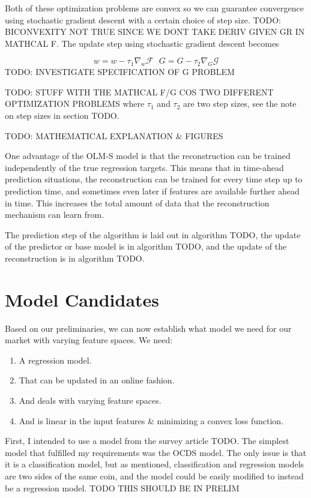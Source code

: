 Both of these optimization problems are convex so we can guarantee convergence
using stochastic gradient descent with a certain choice of step size. TODO:
BICONVEXITY NOT TRUE SINCE WE DONT TAKE DERIV GIVEN GR IN MATHCAL F. The update
step using stochastic gradient descent becomes

\begin{equation}
  w = w - \tau_1 \nabla_w \mathcal F \,\,\,\, G = G - \tau_2 \nabla_G \mathcal G
\end{equation}
TODO: INVESTIGATE SPECIFICATION OF G PROBLEM

TODO: STUFF WITH THE MATHCAL F/G COS TWO DIFFERENT OPTIMIZATION PROBLEMS
where $\tau_1$ and $\tau_2$ are two step sizes, see the note on step sizes in
section TODO.

TODO: MATHEMATICAL EXPLANATION \& FIGURES

One advantage of the OLM-S model is that the reconstruction can be trained
independently of the true regression targets. This means that in time-ahead
prediction situations, the reconstruction can be trained for every time step up
to prediction time, and sometimes even later if features are available further
ahead in time. This increases the total amount of data that the reconstruction
mechanism can learn from.

The prediction step of the algorithm is laid out in algorithm TODO, the update
of the predictor or base model is in algorithm TODO, and the update of the
reconstruction is in algorithm TODO.


\section{Model Candidates}

Based on our preliminaries, we can now establish what model we need for our
market with varying feature spaces. We need:

\begin{enumerate}
  \item A regression model.
  \item That can be updated in an online fashion.
  \item And deals with varying feature spaces.
  \item And is linear in the input features \& minimizing a convex loss
    function.
\end{enumerate}

First, I intended to use a model from the survey article TODO. The simplest
model that fulfilled my requirements was the OCDS model. The only issue is that
it is a classification model, but as mentioned, classification and regression
models are two sides of the same coin, and the model could be easily modified
to instead be a regression model. TODO THIS SHOULD BE IN PRELIM


